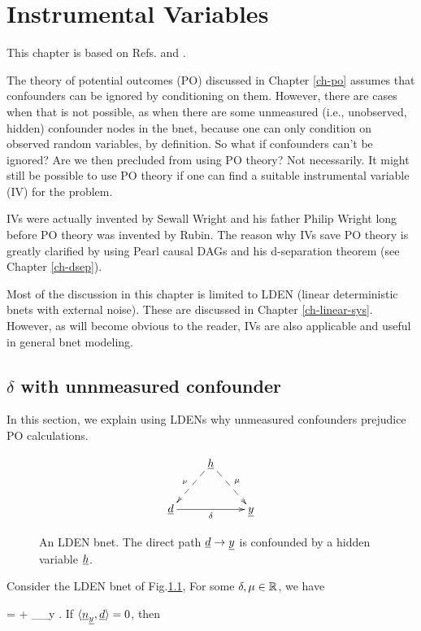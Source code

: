 \chapter{Instrumental Variables}
\label{ch-instrumental}


This chapter is based on
Refs.\cite{book-mixtape} and \cite{wiki-inst-vars}.

The theory of potential outcomes (PO)
discussed in Chapter \ref{ch-po}
assumes that confounders can be ignored
by conditioning on them.
However, there are cases when
that is not possible, as when there are some
unmeasured (i.e., unobserved, hidden)
confounder nodes in the bnet,
because one can
only condition on observed random 
variables, by definition.
So what if confounders can't be ignored?
Are we then precluded from using PO theory?
Not necessarily.
It might still be possible to
use PO theory if one can find a suitable
instrumental variable (IV) for the problem.

IVs were actually invented 
by Sewall Wright and his father Philip
Wright long before
PO theory was invented  by Rubin.
The reason why IVs save PO theory
is greatly clarified by using
Pearl causal DAGs and his d-separation theorem 
(see Chapter \ref{ch-dsep}).

Most of the discussion in this chapter
is  limited to LDEN (linear deterministic
bnets with external noise). These
are discussed in Chapter \ref{ch-linear-sys}.
However, as will become
obvious to the reader, IVs are 
also applicable
and useful
in general bnet modeling.



\section{$\delta$ with unnmeasured confounder}

In this section,
we explain using LDENs 
why
unmeasured confounders 
prejudice PO calculations.

\begin{figure}[h!]
$$
\xymatrix{
&\rvh\ar@{-->}[dl]_\nu\ar@{-->}[dr]^\mu
\\
\rvd\ar[rr]_\delta&&\rvy
}$$
\caption{An LDEN bnet. The direct path ${\underline{d}}\rightarrow{\underline{y}}$
is confounded by
a hidden variable ${\underline{h}}$.
} 
\label{fig-iv-G-start}
\end{figure}

Consider 
the LDEN bnet of Fig.\ref{fig-iv-G-start},
For some $\delta, \mu\in { \mathbb{R}}$, we have

\beq
\rvy = \delta \rvd +
\underbrace{ \mu \rvh + \rvu_\rvy}_{\rvn_y}
\;.
\eeq
If $\langle{\underline{n}}_{\underline{y}}, {\underline{d}}\rangle=0$, then

